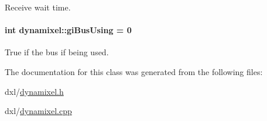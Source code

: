 Receive wait time. 

\hypertarget{a00004_ad10e0e49f5fef04bf789a89c14cc470a}{}
\paragraph[{gi\+Bus\+Using}]{\setlength{\rightskip}{0pt plus 5cm}int dynamixel\+::gi\+Bus\+Using = 0\hspace{0.3cm}{\ttfamily [private]}}\label{a00004_ad10e0e49f5fef04bf789a89c14cc470a}


True if the bus if being used. 



The documentation for this class was generated from the following files\+:\begin{DoxyCompactItemize}
\item 
dxl/\hyperlink{a00015}{dynamixel.\+h}\item 
dxl/\hyperlink{a00014}{dynamixel.\+cpp}\end{DoxyCompactItemize}

